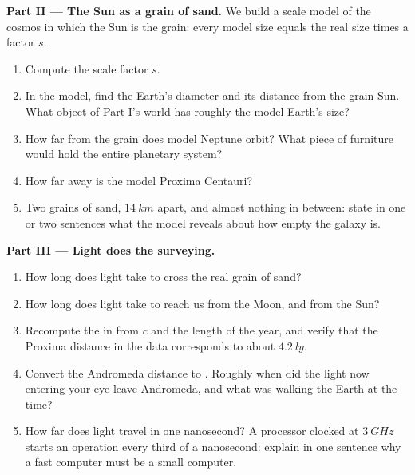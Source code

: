 \begin{problem}
\medskip
\noindent\textbf{Part II --- The Sun as a grain of sand.}
We build a scale model of the cosmos in which the Sun is the grain:
every model size equals the real size times a factor $s$.
\begin{enumerate}[resume]
  \item Compute the scale factor $s$.
  \item In the model, find the Earth's diameter and its distance from
        the grain-Sun. What object of Part I's world has roughly the
        model Earth's size?
  \item How far from the grain does model Neptune orbit? What piece of
        furniture would hold the entire planetary system?
  \item How far away is the model Proxima Centauri?
  \item Two grains of sand, $\qty{14}{km}$ apart, and almost nothing
        in between: state in one or two sentences what the model
        reveals about how empty the galaxy is.
\end{enumerate}

\medskip
\noindent\textbf{Part III --- Light does the surveying.}
\begin{enumerate}[resume]
  \item How long does light take to cross the real grain of sand?
  \item How long does light take to reach us from the Moon, and from
        the Sun?
  \item Recompute the  in  from $c$ and the length of
        the year, and verify that the Proxima distance in the data
        corresponds to about $\qty{4.2}{ly}$.
  \item Convert the Andromeda distance to . Roughly when
        did the light now entering your eye leave Andromeda, and what
        was walking the Earth at the time?
  \item How far does light travel in one nanosecond? A processor
        clocked at $\qty{3}{GHz}$ starts an operation every third of a
        nanosecond: explain in one sentence why a fast computer must
        be a small computer.
\end{enumerate}


\end{problem}
